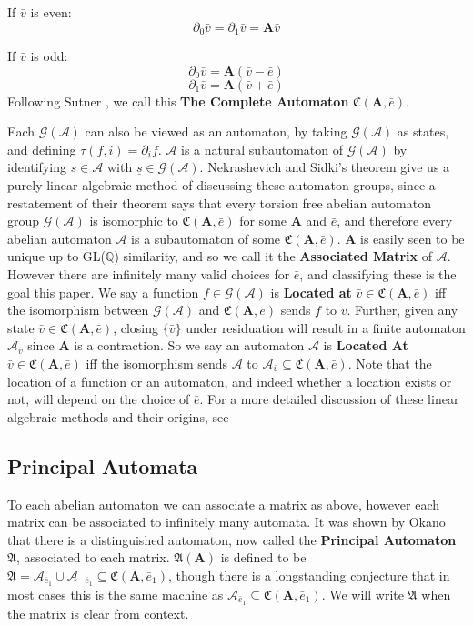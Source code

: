 \documentclass[runningheads]{llncs}
\newcommand{\A}{\mathcal{A}}
\newcommand{\G}{\mathcal{G}}
\renewcommand{\P}{\mathfrak{A}}
\newcommand{\C}{\mathfrak{C}(\Am,\e)}
\newcommand{\Q}{\mathbb{Q}}
\newcommand{\2}{\textbf{2}}
\newcommand{\Am}{\textbf{A}}
\newcommand{\del}{\partial}
\newcommand{\vv}{\bar{v}}
\newcommand{\e}{\bar{e}}
\begin{document}
If $\vv$ is even:
\[ \del_0 \vv = \del_1 \vv = \Am \vv \]

If $\vv$ is odd:
\[ \del_0 \vv = \Am (\vv - \e) \]
\[ \del_1 \vv = \Am (\vv + \e) \]
Following Sutner \cite{Sutner18:abelian_automata}, we call this 
\textbf{The Complete Automaton} $\C$. 

Each $\G(\A)$ can also be viewed as an automaton, by taking $\G(\A)$ 
as states, and defining $\tau(f,i) = \del_i f$. $\A$ is a natural subautomaton
of $\G(\A)$ by identifying $s \in \A$ with $\underline{s} \in \G(\A)$.
Nekrashevich and Sidki's theorem give us a purely linear algebraic method
of discussing these automaton groups, since a restatement of their theorem 
says that every torsion free abelian automaton group $\G(\A)$ is isomorphic 
to $\C$ for some $\Am$ and $\e$, and therefore every abelian automaton $\A$
is a subautomaton of some $\C$. $\Am$ is easily seen to be unique up to 
GL($\Q$) similarity, and so we call it the \textbf{Associated Matrix} of $\A$.
However there are infinitely many valid choices for $\e$, and classifying 
these is the goal this paper. We say a function $f \in \G(\A)$ is 
\textbf{Located at} $\vv \in \C$ iff the isomorphism between $\G(\A)$ and 
$\C$ sends $f$ to $\vv$. Further, given any state $\vv \in \C$, closing 
$\{ \vv \}$ under residuation will result in a finite automaton $\A_{\vv}$ 
since $\Am$ is a contraction. So we say an automaton $\A$ is \textbf{Located At} 
$\vv \in \C$ iff the isomorphism sends $\A$ to $\A_{\vv} \subseteq \C$. 
Note that the location of a function or an automaton, and indeed whether a 
location exists or not, will depend on the choice of $\e$. For a more detailed
discussion of these linear algebraic methods and their origins, see
\cite{Nekrashevych05:self_similar_groups,NekrashevychSidki04:automorphisms}

\subsection{Principal Automata}
To each abelian automaton we can associate a matrix as above, however each
matrix can be associated to infinitely many automata.
It was shown by Okano \cite{Okano15:thesis} that there is a 
distinguished automaton, now called the \textbf{Principal Automaton} $\P$, 
associated to each matrix. $\P(\Am)$ is defined to be 
$\P = \A_{\e_1} \cup \A_{-\e_1} \subseteq \mathfrak{C}(\Am, \e_1)$,
though there is a longstanding conjecture that in most cases this is
the same machine as $\A_{\e_1} \subseteq \mathfrak{C}(\Am, \e_1)$.
We will write $\P$ when the matrix is clear from context. 
\end{document}
